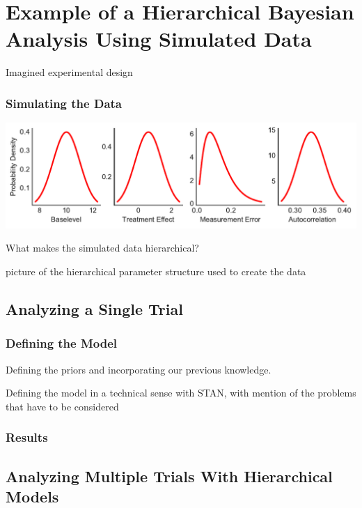 \documentclass[12pt,a4paper,leqno]{report}
\theoremstyle{plain}
\theoremstyle{definition}
\theoremstyle{remark}
\begin{document}
\chapter{Example of a Hierarchical Bayesian Analysis Using Simulated Data}\label{example}

Imagined experimental design

\subsection{Simulating the Data}

\bigskip
{
    \centering
    \includegraphics{population_parameter_distributions.pdf}
    \par
}
\bigskip


What makes the simulated data hierarchical?

picture of the hierarchical parameter structure used to create the data

\section{Analyzing a Single Trial}\label{1trial}

\subsection{Defining the Model}\label{1model}

Defining the priors and incorporating our previous knowledge.

Defining the model in a technical sense with STAN, with mention of the problems that
have to be considered

\subsection{Results}\label{1results}

\section{Analyzing Multiple Trials With Hierarchical Models}\label{pooling}
\end{document}
